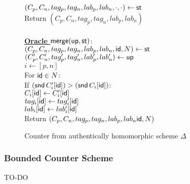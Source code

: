 \documentclass{article}
\begin{document}
\begin{figure}
{\begin{minipage}[t]{.44\linewidth}
	  $(C_p,C_n,tag_p,tag_n,lab_p,lab_n,\cdot,\cdot) \gets \mathsf{st}$\\
	  Return $(C_p,C_n,tag_p,tag_n,lab_p,lab_n)$\\
	  \\
       \underline{\bf Oracle $\mathsf{merge}(\mathsf{up},\mathsf{st})$}: \\
	  $(C_p,C_n,tag_p,tag_n,lab_p,lab_n,\mathsf{id},N) \gets \mathsf{st}$\\
	  $(C_p',C_n',tag_p',tag_n',lab_p',lab_n') \gets \mathsf{up}$\\
	  $i \gets [p,n]$\\
	  For $\mathsf{id} \in N$:\\
	  \phantom{x}If $(\mathsf{snd} \, C_i'[\mathsf{id}]) > (\mathsf{snd} \, C_i[\mathsf{id}])$: \\
	  \phantom{xx}$C_i[\mathsf{id}] \gets C_i'[\mathsf{id}]$\\
	  \phantom{xx}$tag_i[\mathsf{id}] \gets tag_i'[\mathsf{id}]$\\
	  \phantom{xx}$lab_i[\mathsf{id}] \gets lab_i'[\mathsf{id}]$\\
	  Return $(C_p,C_n,tag_p,tag_n,lab_p,lab_n\mathsf{id},N)$
     \end{minipage}
}
  \caption{Counter from authentically homomorphic scheme $\Delta$} 
  \label{fig.counterCRDT}
 \end{figure}

\newpage
\subsubsection{Bounded Counter Scheme}

TO-DO

\end{document}
